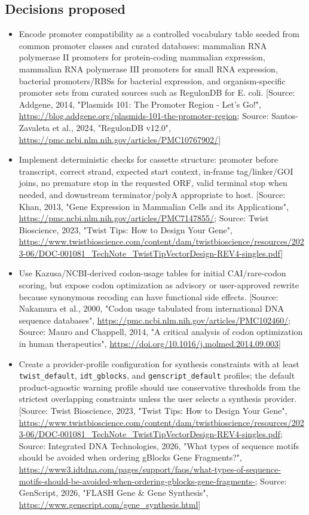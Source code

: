 \documentclass[11pt]{report}
\begin{document}
\subsection{Decisions proposed}
\begin{itemize}
\item Encode promoter compatibility as a controlled vocabulary table seeded from common promoter classes and curated databases: mammalian RNA polymerase II promoters for protein-coding mammalian expression, mammalian RNA polymerase III promoters for small RNA expression, bacterial promoters/RBSs for bacterial expression, and organism-specific promoter sets from curated sources such as RegulonDB for E. coli. [Source: Addgene, 2014, "Plasmids 101: The Promoter Region - Let's Go!", \url{https://blog.addgene.org/plasmids-101-the-promoter-region}; Source: Santos-Zavaleta et al., 2024, "RegulonDB v12.0", \url{https://pmc.ncbi.nlm.nih.gov/articles/PMC10767902/}]
\item Implement deterministic checks for cassette structure: promoter before transcript, correct strand, expected start context, in-frame tag/linker/GOI joins, no premature stop in the requested ORF, valid terminal stop when needed, and downstream terminator/polyA appropriate to host. [Source: Khan, 2013, "Gene Expression in Mammalian Cells and its Applications", \url{https://pmc.ncbi.nlm.nih.gov/articles/PMC7147855/}; Source: Twist Bioscience, 2023, "Twist Tips: How to Design Your Gene", \url{https://www.twistbioscience.com/content/dam/twistbioscience/resources/2023-06/DOC-001081_TechNote_TwistTipVectorDesign-REV4-singles.pdf}]
\item Use Kazusa/NCBI-derived codon-usage tables for initial CAI/rare-codon scoring, but expose codon optimization as advisory or user-approved rewrite because synonymous recoding can have functional side effects. [Source: Nakamura et al., 2000, "Codon usage tabulated from international DNA sequence databases", \url{https://pmc.ncbi.nlm.nih.gov/articles/PMC102460/}; Source: Mauro and Chappell, 2014, "A critical analysis of codon optimization in human therapeutics", \url{https://doi.org/10.1016/j.molmed.2014.09.003}]
\item Create a provider-profile configuration for synthesis constraints with at least \texttt{twist\_default}, \texttt{idt\_gblocks}, and \texttt{genscript\_default} profiles; the default product-agnostic warning profile should use conservative thresholds from the strictest overlapping constraints unless the user selects a synthesis provider. [Source: Twist Bioscience, 2023, "Twist Tips: How to Design Your Gene", \url{https://www.twistbioscience.com/content/dam/twistbioscience/resources/2023-06/DOC-001081_TechNote_TwistTipVectorDesign-REV4-singles.pdf}; Source: Integrated DNA Technologies, 2026, "What types of sequence motifs should be avoided when ordering gBlocks Gene Fragments?", \url{https://www3.idtdna.com/pages/support/faqs/what-types-of-sequence-motifs-should-be-avoided-when-ordering-gblocks-gene-fragments-}; Source: GenScript, 2026, "FLASH Gene \& Gene Synthesis", \url{https://www.genscript.com/gene_synthesis.html}]

\end{itemize}
\end{document}
